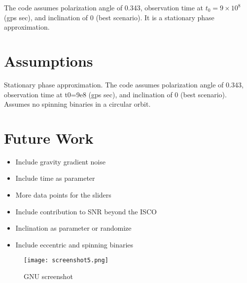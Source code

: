 \documentclass[11pt,fleqn]{book} %
\begin{document}
The code assumes polarization angle of 0.343, observation time at $t_0=9\times 10^8$ (gps sec), and inclination of 0 (best scenario). It is a stationary phase approximation.

\section{Assumptions}

Stationary phase approximation. The code assumes polarization angle of 0.343, observation time at t0=9e8 (gps sec), and inclination of 0 (best scenario). Assumes no spinning binaries in a circular orbit. 

\section{Future Work}

\begin{itemize}
	\item Include gravity gradient noise
	\item Include time as parameter
	\item More data points for the sliders
	\item Include contribution to SNR beyond the ISCO
	\item Inclination as parameter or randomize
	\item Include eccentric and spinning binaries
\end{itemize}


\begin{figure}[p]
    \centering
    \texttt{[image: screenshot5.png]}
    \caption{GNU screenshot}
    \label{fig:awesome_image}
\end{figure}




\end{document}
